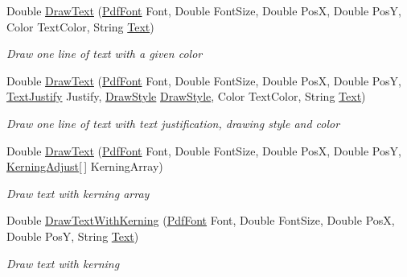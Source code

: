 \begin{DoxyCompactItemize}
Double \hyperlink{class_pdf_file_writer_1_1_pdf_contents_aa6da6ce3c7b4c39e873109fd204c2f5e}{Draw\+Text} (\hyperlink{class_pdf_file_writer_1_1_pdf_font}{Pdf\+Font} Font, Double Font\+Size, Double PosX, Double PosY, Color Text\+Color, String \hyperlink{namespace_pdf_file_writer_a45e52c090a4d8e1333577773ec0bac4aa9dffbf69ffba8bc38bc4e01abf4b1675}{Text})
\begin{DoxyCompactList}\small\item\em Draw one line of text with a given color \end{DoxyCompactList}\item 
Double \hyperlink{class_pdf_file_writer_1_1_pdf_contents_ad155bfaa9dbead132e3dbba21b354c7e}{Draw\+Text} (\hyperlink{class_pdf_file_writer_1_1_pdf_font}{Pdf\+Font} Font, Double Font\+Size, Double PosX, Double PosY, \hyperlink{namespace_pdf_file_writer_a3991bfacc8c7be240452dd24ec817157}{Text\+Justify} Justify, \hyperlink{namespace_pdf_file_writer_a2bcdd73c6cedab15d6f6c2a64333ef39}{Draw\+Style} \hyperlink{namespace_pdf_file_writer_a2bcdd73c6cedab15d6f6c2a64333ef39}{Draw\+Style}, Color Text\+Color, String \hyperlink{namespace_pdf_file_writer_a45e52c090a4d8e1333577773ec0bac4aa9dffbf69ffba8bc38bc4e01abf4b1675}{Text})
\begin{DoxyCompactList}\small\item\em Draw one line of text with text justification, drawing style and color \end{DoxyCompactList}\item 
Double \hyperlink{class_pdf_file_writer_1_1_pdf_contents_a54c6eff9b847d6b0272a1225ebf446cd}{Draw\+Text} (\hyperlink{class_pdf_file_writer_1_1_pdf_font}{Pdf\+Font} Font, Double Font\+Size, Double PosX, Double PosY, \hyperlink{class_pdf_file_writer_1_1_kerning_adjust}{Kerning\+Adjust}\mbox{[}$\,$\mbox{]} Kerning\+Array)
\begin{DoxyCompactList}\small\item\em Draw text with kerning array \end{DoxyCompactList}\item 
Double \hyperlink{class_pdf_file_writer_1_1_pdf_contents_a05baebdd4abf85e8876ffbdd2399d2db}{Draw\+Text\+With\+Kerning} (\hyperlink{class_pdf_file_writer_1_1_pdf_font}{Pdf\+Font} Font, Double Font\+Size, Double PosX, Double PosY, String \hyperlink{namespace_pdf_file_writer_a45e52c090a4d8e1333577773ec0bac4aa9dffbf69ffba8bc38bc4e01abf4b1675}{Text})
\begin{DoxyCompactList}\small\item\em Draw text with kerning \end{DoxyCompactList}\item 

\end{DoxyCompactItemize}
